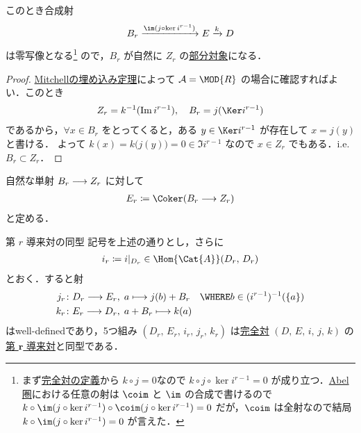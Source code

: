 \documentclass[algtopo_main]{subfiles}
\begin{document}
このとき合成射
\begin{align}
    B_r \xrightarrow{\im (j \circ \ker i^{r-1})} E \xrightarrow{k} D
\end{align}
は零写像となる\footnote{ まず\hyperref[def:exact-couple]{完全対の定義}から $k \circ j = 0$なので
$k \circ j \circ \ker i^{r-1} = 0$
が成り立つ．\hyperref[def:Abel]{Abel圏}における任意の射は $\coim$ と $\im$ の合成で書けるので
$k \circ \im(j \circ \ker i^{r-1}) \circ \coim (j \circ \ker i^{r-1}) = 0$
だが，$\coim$ は全射なので結局 
$k \circ \im(j \circ \ker i^{r-1}) = 0$ 
が言えた．}
ので，$B_r$ が自然に $Z_r$ の\hyperref[def:sub]{部分対象}になる．
\begin{proof}
    \hyperref[thm:embedding]{Mitchellの埋め込み定理}によって $\mathcal{A} = \MOD{R}$ の場合に確認すればよい．このとき
    \begin{align}
        Z_r = k^{-1}(\Im i^{r-1}),\quad B_r = j(\Ker i^{r-1})
    \end{align}
    であるから，$\forall x \in B_r$ をとってくると，ある $y \in \Ker i^{r-1}$ が存在して $x = j(y)$ と書ける．
    よって $k(x) = k \bigl( j(y) \bigr) = 0 \in \Im i^{r-1}$ なので $x \in Z_r$ でもある．i.e. $B_r \subset Z_r$．
\end{proof}
自然な単射 $B_r \longrightarrow Z_r$ に対して
\begin{align}
    E_r \coloneqq \Coker (B_r \lto Z_r)
\end{align}
と定める．

\begin{myprop}[label=prop:DC-rth]{第 $r$ 導来対の同型}
    記号を上述の通りとし，さらに
    \begin{align}
        i_r \coloneqq i|_{D_r} \in \Hom{\Cat{A}} (D_r,\, D_r)
    \end{align}
    とおく．すると射
    \begin{align}
        j_r &\colon D_r \lto E_r,\; a \lmto j(b) + B_r\quad \WHERE b \in (i^{r-1})^{-1} (\{a\}) \\
        k_r &\colon E_r \lto D_r,\; a + B_r \lmto k(a)
    \end{align}
    はwell-definedであり，5つ組み $(D_r,\, E_r,\, i_r,\, j_r,\, k_r)$ は\hyperref[def:exact-couple]{完全対} $(D,\, E,\, i,\, j,\, k)$ の\hyperref[def:DC]{第 $\bm{r}$ 導来対}と同型である．
\end{myprop}  
\end{document}
